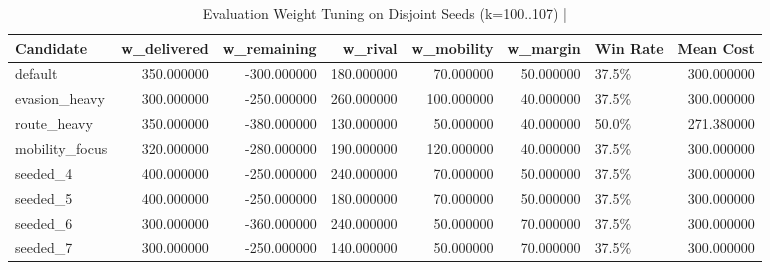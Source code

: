 \begin{table}[htbp]
\centering
\caption{Evaluation Weight Tuning on Disjoint Seeds (k=100..107) | \stampline}
\label{tab:partC_tuning}
\begin{tabular}{lrrrrrlr}
\toprule
Candidate & w\_delivered & w\_remaining & w\_rival & w\_mobility & w\_margin & Win Rate & Mean Cost \\
\midrule
default & 350.000000 & -300.000000 & 180.000000 & 70.000000 & 50.000000 & 37.5\% & 300.000000 \\
evasion\_heavy & 300.000000 & -250.000000 & 260.000000 & 100.000000 & 40.000000 & 37.5\% & 300.000000 \\
route\_heavy & 350.000000 & -380.000000 & 130.000000 & 50.000000 & 40.000000 & 50.0\% & 271.380000 \\
mobility\_focus & 320.000000 & -280.000000 & 190.000000 & 120.000000 & 40.000000 & 37.5\% & 300.000000 \\
seeded\_4 & 400.000000 & -250.000000 & 240.000000 & 70.000000 & 50.000000 & 37.5\% & 300.000000 \\
seeded\_5 & 400.000000 & -250.000000 & 180.000000 & 70.000000 & 50.000000 & 37.5\% & 300.000000 \\
seeded\_6 & 300.000000 & -360.000000 & 240.000000 & 50.000000 & 70.000000 & 37.5\% & 300.000000 \\
seeded\_7 & 300.000000 & -250.000000 & 140.000000 & 50.000000 & 70.000000 & 37.5\% & 300.000000 \\
\bottomrule
\end{tabular}

\end{table}
